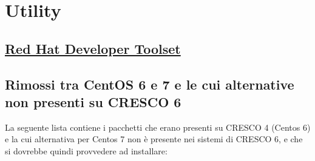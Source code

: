 \documentclass[11pt]{article}
\begin{document}
\section{Utility}
\subsection{\href{https://developers.redhat.com/products/developertoolset/overview/}{Red Hat Developer Toolset}}

\subsection{Rimossi tra CentOS 6 e 7 e le cui alternative non presenti su CRESCO 6}
La seguente lista contiene i pacchetti che erano presenti su CRESCO 4 (Centos 6) e la cui alternativa per Centos 7 non è presente
nei sistemi di CRESCO 6, e che si dovrebbe quindi provvedere ad installare:
\end{document}
